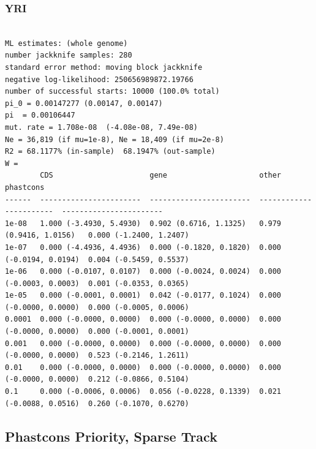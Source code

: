 \documentclass[11pt]{article}
\begin{document}
\subsubsection*{YRI}
\begin{minipage}{\linewidth}\begin{footnotesize}
\begin{verbatim}

ML estimates: (whole genome)
number jackknife samples: 280
standard error method: moving block jackknife
negative log-likelihood: 250656989872.19766
number of successful starts: 10000 (100.0% total)
pi_0 = 0.00147277 (0.00147, 0.00147)
pi  = 0.00106447
mut. rate = 1.708e-08  (-4.08e-08, 7.49e-08)
Ne = 36,819 (if mu=1e-8), Ne = 18,409 (if mu=2e-8)
R2 = 68.1177% (in-sample)  68.1947% (out-sample)
W = 
        CDS                      gene                     other                    phastcons
------  -----------------------  -----------------------  -----------------------  -----------------------
1e-08   1.000 (-3.4930, 5.4930)  0.902 (0.6716, 1.1325)   0.979 (0.9416, 1.0156)   0.000 (-1.2400, 1.2407)
1e-07   0.000 (-4.4936, 4.4936)  0.000 (-0.1820, 0.1820)  0.000 (-0.0194, 0.0194)  0.004 (-0.5459, 0.5537)
1e-06   0.000 (-0.0107, 0.0107)  0.000 (-0.0024, 0.0024)  0.000 (-0.0003, 0.0003)  0.001 (-0.0353, 0.0365)
1e-05   0.000 (-0.0001, 0.0001)  0.042 (-0.0177, 0.1024)  0.000 (-0.0000, 0.0000)  0.000 (-0.0005, 0.0006)
0.0001  0.000 (-0.0000, 0.0000)  0.000 (-0.0000, 0.0000)  0.000 (-0.0000, 0.0000)  0.000 (-0.0001, 0.0001)
0.001   0.000 (-0.0000, 0.0000)  0.000 (-0.0000, 0.0000)  0.000 (-0.0000, 0.0000)  0.523 (-0.2146, 1.2611)
0.01    0.000 (-0.0000, 0.0000)  0.000 (-0.0000, 0.0000)  0.000 (-0.0000, 0.0000)  0.212 (-0.0866, 0.5104)
0.1     0.000 (-0.0006, 0.0006)  0.056 (-0.0228, 0.1339)  0.021 (-0.0088, 0.0516)  0.260 (-0.1070, 0.6270)
\end{verbatim}
\end{footnotesize}\end{minipage}


\subsection{Phastcons Priority, Sparse Track}
\end{document}
